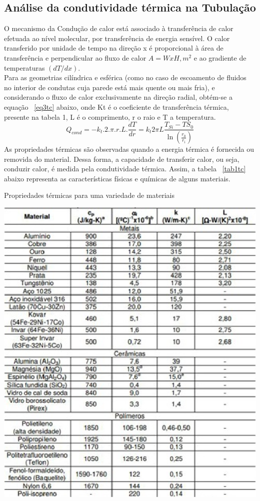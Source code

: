 \subsection{Análise da condutividade térmica na Tubulação}
O mecanismo da Condução de calor está associado à transferência de calor efetuada ao nível molecular, por transferência de energia sensível. O calor transferido por unidade de tempo na direção x é proporcional à área de transferência e perpendicular ao fluxo de calor $A =WxH, m^2$ e ao gradiente de temperaturas $(dT/dx)$. \\
Para as geometrias cilíndrica e esférica (como no caso de escoamento de fluidos no interior de condutas cuja parede está mais quente ou mais fria), e considerando o fluxo de calor exclusivamente na direção radial, obtém-se a equação ~\ref{eq3tc} abaixo, onde Kt é o coeficiente de transferência térmica, presente na tabela 1, L é o comprimento, r o raio e T a temperatura.\\
\begin{equation}\label{eq3tc}
Q_{cond}=-k_t.2.\pi.r.L.\frac{dT}{dr}=k_t2\pi L\frac{T_{Si}-T{S_0}}{\ln(\frac{r_0}{r_i})}
\end{equation}
As propriedades térmicas  são observadas quando a energia térmica é fornecida ou removida do material. Dessa forma, a capacidade de transferir calor, ou seja, conduzir calor, é medida pela condutividade térmica. Assim, a tabela ~\ref{tab1tc} abaixo representa as características físicas e químicas de alguns materiais.
\begin{table}[!htb]
	\centering
	\caption{Propriedades térmicas para uma variedade de materiais}\label{tab1tc}
    \includegraphics[scale=1]{figuras/Figura4tc.eps}
\end{table}
